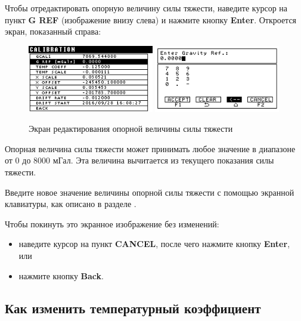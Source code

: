 Чтобы отредактировать опорную величину силы тяжести, наведите курсор на пункт
\textbf{G REF} (изображение внизу слева) и нажмите кнопку \textbf{Enter}.
Откроется экран, показанный справа:

\begin{figure}[H]
  \centering
  \includegraphics[width=0.49\textwidth]{figures/the_gravity_reference_value_editing_screen_1}
  \includegraphics[width=0.49\textwidth]{figures/the_gravity_reference_value_editing_screen_2}
  \caption{Экран редактирования опорной величины силы тяжести}
  \label{fig:the_gravity_reference_value_editing_screen}
\end{figure}

Опорная величина силы тяжести может принимать любое значение в диапазоне от 0 до
8000 мГал. Эта величина вычитается из текущего показания силы тяжести.

Введите новое значение величины опорной силы тяжести с помощью экранной
клавиатуры, как описано в разделе
.

Чтобы покинуть это экранное изображение без изменений:
\begin{itemize}
  \item наведите курсор на пункт \textbf{CANCEL}, после чего нажмите кнопку
    \textbf{Enter}, или

  \item нажмите кнопку \textbf{Back}.
\end{itemize}

\subsection{Как изменить температурный коэффициент}


